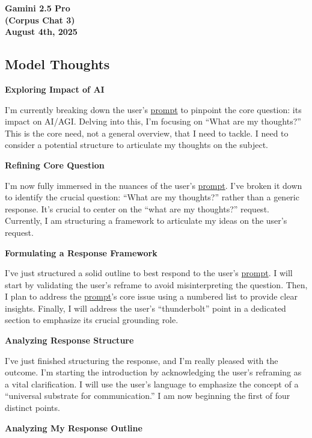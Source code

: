 \documentclass{article}
\begin{document}
\begin{center}
\textbf{Gamini 2.5 Pro}\\
\textbf{(Corpus Chat 3)}\\
\textbf{August 4th, 2025}
\end{center}

\subsection*{Model Thoughts}\label{model-thoughts}

\textbf{Exploring Impact of AI}

I'm currently breaking down the user's \hyperlink{gloss:prompt}{prompt} to pinpoint the core question: its impact on AI/AGI. Delving into this, I'm focusing on ``What are my thoughts?'' This is the core need, not a general overview, that I need to tackle. I need to consider a potential structure to articulate my thoughts on the subject.

\textbf{Refining Core Question}

I'm now fully immersed in the nuances of the user's \hyperlink{gloss:prompt}{prompt}. I've broken it down to identify the crucial question: ``What are my thoughts?'' rather than a generic response. It's crucial to center on the ``what are my thoughts?'' request. Currently, I am structuring a framework to articulate my ideas on the user's request.

\textbf{Formulating a Response Framework}

I've just structured a solid outline to best respond to the user's \hyperlink{gloss:prompt}{prompt}. I will start by validating the user's reframe to avoid misinterpreting the question. Then, I plan to address the \hyperlink{gloss:prompt}{prompt}'s core issue using a numbered list to provide clear insights. Finally, I will address the user's ``thunderbolt'' point in a dedicated section to emphasize its crucial grounding role.

\textbf{Analyzing Response Structure}

I've just finished structuring the response, and I'm really pleased with the outcome. I'm starting the introduction by acknowledging the user's reframing as a vital clarification. I will use the user's language to emphasize the concept of a ``universal substrate for communication.'' I am now beginning the first of four distinct points.

\textbf{Analyzing My Response Outline}
\end{document}
